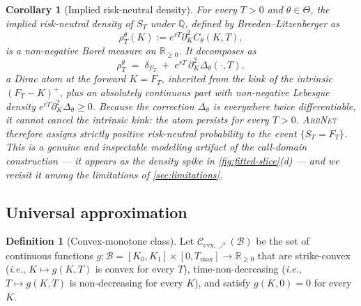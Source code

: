 \documentclass[largeformat]{interact}
\theoremstyle{plain}
\newtheorem{corollary}[theorem]{Corollary}
\theoremstyle{definition}
\newtheorem{definition}[theorem]{Definition}
\newcommand{\R}{\mathbb{R}}
\newcommand{\Qm}{\mathbb{Q}}
\newcommand{\eqdef}{:=}
\newcommand{\arbnet}{\textsc{ArbNet}}
\begin{document}
\begin{corollary}[Implied risk-neutral density]
\label{cor:rnd}
For every $T > 0$ and $\theta \in \Theta$, the implied risk-neutral density of $S_T$ under $\Qm$, defined by Breeden--Litzenberger as
\[
\rho^\theta_T(K) \eqdef e^{rT} \partial^2_K C_\theta(K, T),
\]
is a non-negative Borel measure on $\R_{\geq 0}$. It decomposes as
\[
\rho^\theta_T \;=\; \delta_{F_T} \;+\; e^{rT}\,\partial^2_K \Delta_\theta(\cdot, T),
\]
a Dirac atom at the forward $K = F_T$, inherited from the kink of the intrinsic $(F_T - K)^+$, plus an absolutely continuous part with non-negative Lebesgue density $e^{rT}\partial^2_K \Delta_\theta \geq 0$. Because the correction $\Delta_\theta$ is everywhere twice differentiable, it cannot cancel the intrinsic kink: the atom persists for \emph{every} $T > 0$. \arbnet{} therefore assigns strictly positive risk-neutral probability to the event $\{S_T = F_T\}$. This is a genuine and inspectable modelling artifact of the call-domain construction --- it appears as the density spike in \cref{fig:fitted-slice}(d) --- and we revisit it among the limitations of \cref{sec:limitations}.
\end{corollary}

\subsection{Universal approximation}
\label{sec:universal-approximation}

\begin{definition}[Convex-monotone class]
\label{def:cvx-mon-class}
Let $\mathcal{C}_{\mathrm{cvx},\nearrow}(\mathcal{B})$ be the set of continuous functions $g : \mathcal{B} = [K_0, K_1] \times [0, T_{\max}] \to \R_{\geq 0}$ that are strike-convex (\emph{i.e.}, $K \mapsto g(K, T)$ is convex for every $T$), time-non-decreasing (\emph{i.e.}, $T \mapsto g(K, T)$ is non-decreasing for every $K$), and satisfy $g(K, 0) = 0$ for every $K$.
\end{definition}
\end{document}
